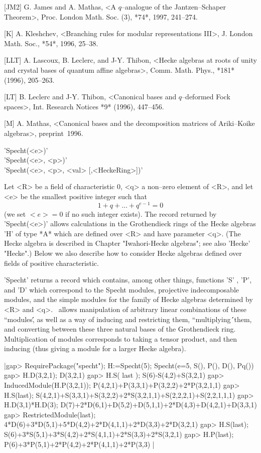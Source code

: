 [JM2] G. James and A. Mathas,
  <A $q$--analogue of the Jantzen--Schaper Theorem>, Proc. London Math. 
  Soc. (3), *74*, 1997, 241--274.

[K] A. Kleshchev,
  <Branching rules for modular representations III>, 
  J. London Math. Soc., *54*, 1996, 25--38.

[LLT] A. Lascoux, B. Leclerc, and J-Y. Thibon,
  <Hecke algebras at roots of unity and crystal bases of quantum
   affine algebras>, Comm. Math. Phys., *181* (1996), 205--263.

[LT] B. Leclerc and J-Y. Thibon,
  <Canonical bases and $q$--deformed Fock spaces>, Int. Research Notices
  *9* (1996), 447--456.

[M] A. Mathas,
    <Canonical bases and the decomposition matrices of Ariki--Koike
     algebras>, preprint~1996.



'Specht(<e>)'\\
'Specht(<e>, <p>)'\\
'Specht(<e>, <p>, <val> [,<HeckeRing>])' 

Let <R> be a field of characteristic 0, <q> a non--zero element of <R>, 
and let <e> be the smallest positive integer such that
                $$  1+q+\ldots+q^{e-1}=0  $$ 
(we set $<e>=0$ if no such integer exists). The record returned 
by 'Specht(<e>)' allows calculations in the Grothendieck rings of 
the Hecke algebras 'H' of type *A* which are defined over <R> and 
have parameter <q>. (The Hecke algebra is described in Chapter 
"Iwahori-Hecke algebras"; see also 'Hecke' "Hecke".) Below we also
describe how to consider Hecke algebras defined over fields of positive 
characteristic.

'Specht' returns a record which contains, among other things, functions 
'S' , 'P', and 'D' which correspond to the Specht modules, projective 
indecomposable modules, and the simple modules for the family of Hecke 
algebras determined by <R> and <q>. \Specht\ allows manipulation of
arbitrary linear combinations of these ``modules\'\', as well as a way
of inducing and restricting them, ``multiplying\'\'\ them, and converting 
between these three natural bases of the Grothendieck ring. Multiplication 
of modules corresponds to taking a tensor product, and then inducing (thus 
giving a module for a larger Hecke algebra).

|gap> RequirePackage("specht"); H:=Specht(5);
Specht(e=5, S(), P(), D(), Pq())
gap> H.D(3,2,1);
D(3,2,1)
gap> H.S( last );
S(6)-S(4,2)+S(3,2,1)
gap> InducedModule(H.P(3,2,1));
P(4,2,1)+P(3,3,1)+P(3,2,2)+2*P(3,2,1,1)
gap> H.S(last);
S(4,2,1)+S(3,3,1)+S(3,2,2)+2*S(3,2,1,1)+S(2,2,2,1)+S(2,2,1,1,1)
gap> H.D(3,1)*H.D(3);
D(7)+2*D(6,1)+D(5,2)+D(5,1,1)+2*D(4,3)+D(4,2,1)+D(3,3,1)
gap> RestrictedModule(last);
4*D(6)+3*D(5,1)+5*D(4,2)+2*D(4,1,1)+2*D(3,3)+2*D(3,2,1)
gap> H.S(last);
S(6)+3*S(5,1)+3*S(4,2)+2*S(4,1,1)+2*S(3,3)+2*S(3,2,1)
gap> H.P(last);
P(6)+3*P(5,1)+2*P(4,2)+2*P(4,1,1)+2*P(3,3) |

